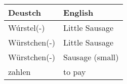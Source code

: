 \documentclass{article}
\renewcommand{\arraystretch}{1}
\begin{document}
\newpage

\begin{minipage}{0.48\textwidth}
    \centering
    \renewcommand{\arraystretch}{1.5}
    \begin{tabular}{|>{\raggedright\arraybackslash}p{3.5cm}|>{\raggedright\arraybackslash}p{3.5cm}|}
        \hline
        \rowcolor{gray!20} \textbf{Deustch} & \textbf{English} \\
        \hline
        Wúrstel(-) & Little Sausage \\\hline
        Würstchen(-) & Little Sausage \\\hline
        Würstchen(-) & Sausage (small) \\\hline
        zahlen & to pay \\\hline
    \end{tabular}
\end{minipage}%
\end{document}
